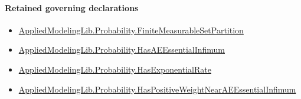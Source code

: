 \documentclass[10pt]{article}
\begin{document}
\paragraph{Retained governing declarations}
\begin{itemize}\raggedright
\item \hyperlink{governing-declaration-774cb983dcb50264}{Applied\allowbreak{}Modeling\allowbreak{}Lib.\allowbreak{}Probability.\allowbreak{}Finite\allowbreak{}Measurable\allowbreak{}Set\allowbreak{}Partition}
\item \hyperlink{governing-declaration-d6063268c2725f36}{Applied\allowbreak{}Modeling\allowbreak{}Lib.\allowbreak{}Probability.\allowbreak{}Has\allowbreak{}AE\allowbreak{}Essential\allowbreak{}Infimum}
\item \hyperlink{governing-declaration-e023a17eef63c747}{Applied\allowbreak{}Modeling\allowbreak{}Lib.\allowbreak{}Probability.\allowbreak{}Has\allowbreak{}Exponential\allowbreak{}Rate}
\item \hyperlink{governing-declaration-dda798e5441c4511}{Applied\allowbreak{}Modeling\allowbreak{}Lib.\allowbreak{}Probability.\allowbreak{}Has\allowbreak{}Positive\allowbreak{}Weight\allowbreak{}Near\allowbreak{}AE\allowbreak{}Essential\allowbreak{}Infimum}
\end{itemize}
\end{document}
